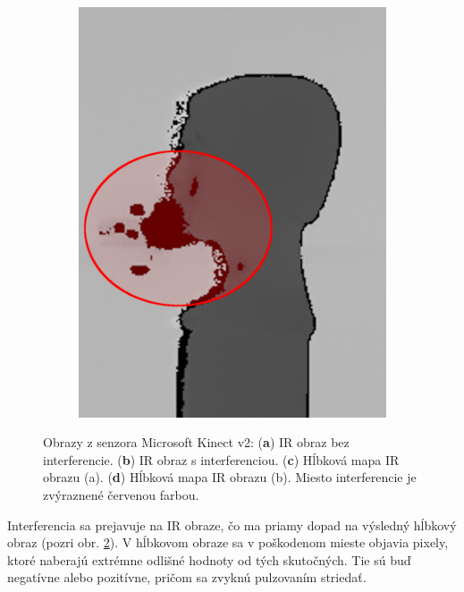 \begin{figure}[h]
\begin{subfigure}[b]{0.2\textwidth}
		\includegraphics[width=\textwidth]{figures/depth_ir-d.png}
		\caption{}
		\label{fig:depthir:d}
	\end{subfigure}
	\caption{Obrazy z senzora Microsoft Kinect v2: (\textbf{a}) IR obraz bez interferencie. (\textbf{b}) IR obraz s interferenciou. (\textbf{c}) Hĺbková mapa IR obrazu (a). (\textbf{d}) Hĺbková mapa IR obrazu (b). Miesto interferencie je zvýraznené červenou farbou.}
	\label{fig:depthir}
\end{figure}

Interferencia sa prejavuje na IR obraze, čo ma priamy dopad na výsledný hĺbkový obraz (pozri obr. \ref{fig:depthir}). V hĺbkovom obraze sa v poškodenom mieste objavia pixely, ktoré naberajú extrémne odlišné hodnoty od tých skutočných. Tie sú buď negatívne alebo pozitívne, pričom sa zvyknú pulzovaním striedať. 

